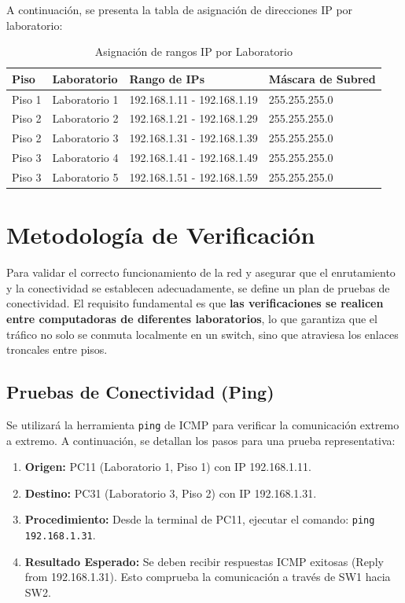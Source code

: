\documentclass[12pt, a4paper]{article}
\begin{document}
A continuación, se presenta la tabla de asignación de direcciones IP por laboratorio:

\begin{table}[H]
    \centering
    \caption{Asignación de rangos IP por Laboratorio}
    \label{tab:ips}
    \begin{tabular}{@{}llll@{}}
        \toprule
        \textbf{Piso} & \textbf{Laboratorio} & \textbf{Rango de IPs} & \textbf{Máscara de Subred} \\ \midrule
        Piso 1 & Laboratorio 1 & 192.168.1.11 - 192.168.1.19 & 255.255.255.0 \\
        Piso 2 & Laboratorio 2 & 192.168.1.21 - 192.168.1.29 & 255.255.255.0 \\
        Piso 2 & Laboratorio 3 & 192.168.1.31 - 192.168.1.39 & 255.255.255.0 \\
        Piso 3 & Laboratorio 4 & 192.168.1.41 - 192.168.1.49 & 255.255.255.0 \\
        Piso 3 & Laboratorio 5 & 192.168.1.51 - 192.168.1.59 & 255.255.255.0 \\ \bottomrule
    \end{tabular}
\end{table}

\section{Metodología de Verificación}
Para validar el correcto funcionamiento de la red y asegurar que el enrutamiento y la conectividad se establecen adecuadamente, se define un plan de pruebas de conectividad. El requisito fundamental es que \textbf{las verificaciones se realicen entre computadoras de diferentes laboratorios}, lo que garantiza que el tráfico no solo se conmuta localmente en un switch, sino que atraviesa los enlaces troncales entre pisos.

\subsection{Pruebas de Conectividad (Ping)}
Se utilizará la herramienta \texttt{ping} de ICMP para verificar la comunicación extremo a extremo. A continuación, se detallan los pasos para una prueba representativa:

\begin{enumerate}
    \item \textbf{Origen:} PC11 (Laboratorio 1, Piso 1) con IP 192.168.1.11.
    \item \textbf{Destino:} PC31 (Laboratorio 3, Piso 2) con IP 192.168.1.31.
    \item \textbf{Procedimiento:} Desde la terminal de PC11, ejecutar el comando: \texttt{ping 192.168.1.31}.
    \item \textbf{Resultado Esperado:} Se deben recibir respuestas ICMP exitosas (Reply from 192.168.1.31). Esto comprueba la comunicación a través de SW1 hacia SW2.
\end{enumerate}
\end{document}
